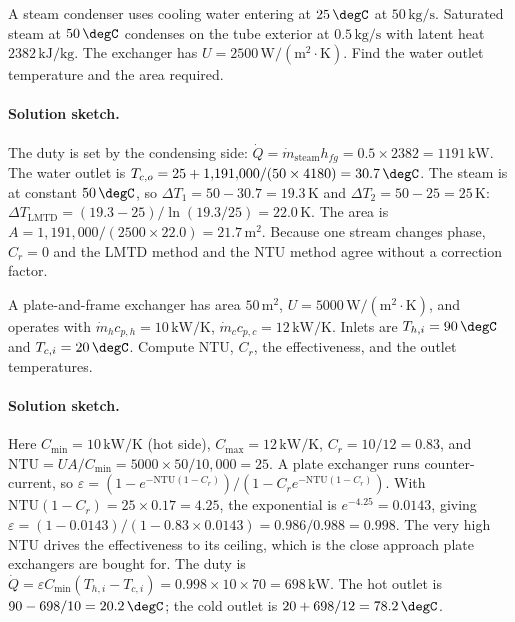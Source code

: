 \begin{exercise}
A steam condenser uses cooling water entering at $25\,\degC$ at
$50\,\text{kg/s}$. Saturated steam at $50\,\degC$ condenses on the tube
exterior at $0.5\,\text{kg/s}$ with latent heat $2382\,\text{kJ/kg}$.
The exchanger has $U = 2500\,\text{W}/(\text{m}^2\cdot\si{\kelvin})$.
Find the water outlet temperature and the area required.

\paragraph{Solution sketch.} The duty is set by the condensing side:
$\dot{Q} = \dot{m}_{\text{steam}} h_{fg} = 0.5 \times 2382 = 1191\,
\text{kW}$. The water outlet is $T_{c,o} = 25 + 1{,}191{,}000/(50
\times 4180) = 30.7\,\degC$. The steam is at constant $50\,\degC$, so
$\Delta T_1 = 50 - 30.7 = 19.3\,\si{\kelvin}$ and $\Delta T_2 = 50 -
25 = 25\,\si{\kelvin}$: $\Delta T_{\text{LMTD}} = (19.3 -
25)/\ln(19.3/25) = 22.0\,\si{\kelvin}$. The area is $A = 1{,}191{,}000/
(2500 \times 22.0) = 21.7\,\text{m}^2$. Because one stream changes
phase, $C_r = 0$ and the LMTD method and the NTU method agree without a
correction factor.
\end{exercise}

\begin{exercise}
A plate-and-frame exchanger has area $50\,\text{m}^2$, $U = 5000\,
\text{W}/(\text{m}^2\cdot\si{\kelvin})$, and operates with
$\dot{m}_h c_{p,h} = 10\,\text{kW}/\si{\kelvin}$, $\dot{m}_c c_{p,c}
= 12\,\text{kW}/\si{\kelvin}$. Inlets are $T_{h,i} = 90\,\degC$ and
$T_{c,i} = 20\,\degC$. Compute NTU, $C_r$, the effectiveness, and the
outlet temperatures.

\paragraph{Solution sketch.} Here $C_{\min} = 10\,\text{kW}/\si{\kelvin}$
(hot side), $C_{\max} = 12\,\text{kW}/\si{\kelvin}$, $C_r = 10/12 =
0.83$, and $\text{NTU} = UA/C_{\min} = 5000 \times 50/10{,}000 = 25$.
A plate exchanger runs counter-current, so $\varepsilon = (1 - e^{-
\text{NTU}(1 - C_r)})/(1 - C_r e^{-\text{NTU}(1 - C_r)})$. With
$\text{NTU}(1 - C_r) = 25 \times 0.17 = 4.25$, the exponential is
$e^{-4.25} = 0.0143$, giving $\varepsilon = (1 - 0.0143)/(1 - 0.83
\times 0.0143) = 0.986/0.988 = 0.998$. The very high NTU drives the
effectiveness to its ceiling, which is the close approach
plate exchangers are bought for. The duty is $\dot{Q} = \varepsilon
C_{\min}(T_{h,i} - T_{c,i}) = 0.998 \times 10 \times 70 = 698\,\text{kW}$.
The hot outlet is $90 - 698/10 = 20.2\,\degC$; the cold outlet is $20 +
698/12 = 78.2\,\degC$.
\end{exercise}

